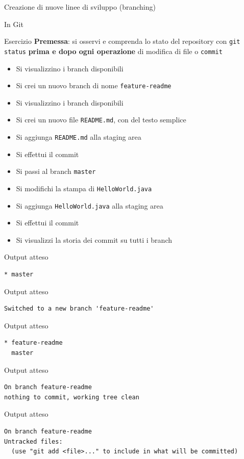\documentclass[xcolor=dvipsnames,presentation]{beamer}
\begin{document}
\begin{frame}{Creazione di nuove linee di sviluppo (branching)}
\begin{block}{In Git}
\begin{itemize}
		\end{itemize}
	\end{block}
	\begin{block}{Esercizio}
		\textbf{Premessa}: si osservi e comprenda lo stato del repository con \texttt{git status} \textbf{prima e dopo ogni operazione} di modifica di file o \texttt{commit}
		\begin{itemize}
			\footnotesize
			\item Si visualizzino i branch disponibili
			\item Si crei un nuovo branch di nome \texttt{feature-readme}
			\item Si visualizzino i branch disponibili
			\item Si crei un nuovo file \texttt{README.md}, con del testo semplice
			\item Si aggiunga \texttt{README.md} alla staging area
			\item Si effettui il commit
			\item Si passi al branch \texttt{master}
			\item Si modifichi la stampa di \texttt{HelloWorld.java}
			\item Si aggiunga \texttt{HelloWorld.java} alla staging area
			\item Si effettui il commit
			\item Si visualizzi la storia dei commit su tutti i branch
		\end{itemize}
	\end{block}
	\begin{block}{Output atteso}
		\begin{Verbatim}[fontsize=\scriptsize]
* master
		\end{Verbatim}
	\end{block}
	\begin{block}{Output atteso}
		\begin{Verbatim}[fontsize=\scriptsize]
Switched to a new branch 'feature-readme'
		\end{Verbatim}
	\end{block}
	\begin{block}{Output atteso}
		\begin{Verbatim}[fontsize=\scriptsize]
* feature-readme
  master
		\end{Verbatim}
	\end{block}
	\begin{block}{Output atteso}
		\begin{Verbatim}[fontsize=\scriptsize]
On branch feature-readme
nothing to commit, working tree clean
		\end{Verbatim}
	\end{block}
	\begin{block}{Output atteso}
		\begin{Verbatim}[fontsize=\scriptsize]
On branch feature-readme
Untracked files:
  (use "git add <file>..." to include in what will be committed)


\end{Verbatim}
\end{block}
\end{frame}
\end{document}
